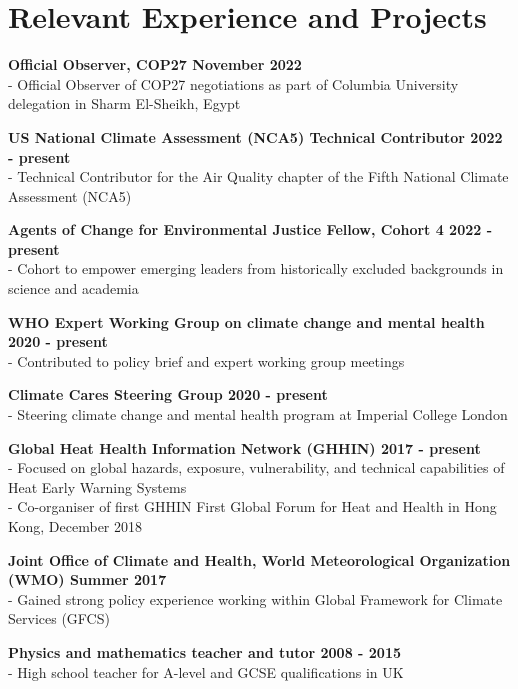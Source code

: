 \section*{Relevant Experience and Projects}

\noindent \textbf{Official Observer, COP27 \hfill November 2022}\\
- Official Observer of COP27 negotiations as part of Columbia University delegation in Sharm El-Sheikh, Egypt \bigskip

\noindent \textbf{US National Climate Assessment (NCA5) Technical Contributor \hfill 2022 - present}\\
- Technical Contributor for the Air Quality chapter of the Fifth National Climate Assessment (NCA5) \bigskip

\noindent \textbf{Agents of Change for Environmental Justice Fellow, Cohort 4 \hfill 2022 - present}\\
- Cohort to empower emerging leaders from historically excluded backgrounds in science and academia \bigskip

\noindent \textbf{WHO Expert Working Group on climate change and mental health \hfill 2020 - present}\\
- Contributed to policy brief and expert working group meetings \bigskip

\noindent \textbf{Climate Cares Steering Group \hfill 2020 - present}\\
- Steering climate change and mental health program at Imperial College London \bigskip

\noindent \textbf{Global Heat Health Information Network (GHHIN) \hfill 2017 - present}\\
- Focused on global hazards, exposure, vulnerability, and technical capabilities of Heat Early Warning Systems\\
- Co-organiser of first GHHIN First Global Forum for Heat and Health in Hong Kong, December 2018 \bigskip

\noindent \textbf{Joint Office of Climate and Health, World Meteorological Organization (WMO) \hfill Summer 2017}\\
\noindent - Gained strong policy experience working within Global Framework for Climate Services (GFCS) \bigskip

\noindent \textbf{Physics and mathematics teacher and tutor \hfill 2008 - 2015}\\
- High school teacher for A-level and GCSE qualifications in UK

